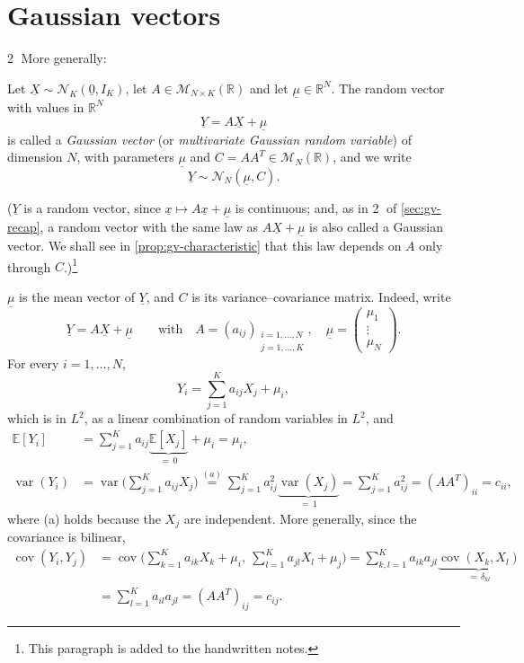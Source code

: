 \section{Gaussian vectors}\label{sec:gv-gaussian}

\textcircled{\scriptsize 2} More generally:

\begin{definition}\label{def:gv-gaussian-vector}
Let $\underline X\sim\mathcal N_K(\underline 0,I_K)$, let $A\in\mathcal M_{N\times K}(\mathbb R)$ and
let $\underline\mu\in\mathbb R^N$. The random vector with values in $\mathbb R^N$
\[
  \underline Y=A\underline X+\underline\mu
\]
is called a \emph{Gaussian vector} (or \emph{multivariate Gaussian random variable}) of dimension
$N$, with parameters $\underline\mu$ and $C=AA^T\in\mathcal M_N(\mathbb R)$, and we write
\[
  \underline Y\sim\mathcal N_N(\underline\mu,C).
\]
\end{definition}

($\underline Y$ is a random vector, since $\underline x\mapsto A\underline x+\underline\mu$ is
continuous; and, as in \textcircled{\scriptsize 2} of \cref{sec:gv-recap}, a random vector with
the same law as $A\underline X+\underline\mu$ is also called a Gaussian vector. We shall see in
\cref{prop:gv-characteristic} that this law depends on $A$ only through $C$.)\footnote{This
paragraph is added to the handwritten notes.}

\begin{remark}\label{rem:gv-mean-covariance}
$\underline\mu$ is the mean vector of $\underline Y$, and $C$ is its variance--covariance matrix.
Indeed, write
\[
  \underline Y=A\underline X+\underline\mu\qquad\text{with}\quad A=(a_{ij})_{\substack{i=1,\dots,N\\j=1,\dots,K}},\quad
  \underline\mu=\begin{pmatrix}\mu_1\\\vdots\\\mu_N\end{pmatrix}.
\]
For every $i=1,\dots,N$,
\[
  Y_i=\sum_{j=1}^Ka_{ij}X_j+\mu_i ,
\]
which is in $L^2$, as a linear combination of random variables in $L^2$, and
\[
\begin{aligned}
  \mathbb E[Y_i]&=\sum_{j=1}^Ka_{ij}\underbrace{\mathbb E[X_j]}_{=\,0}+\mu_i=\mu_i,\\
  \operatorname{var}(Y_i)&=\operatorname{var}\Big(\sum_{j=1}^Ka_{ij}X_j\Big)
  \overset{(a)}{=}\sum_{j=1}^Ka_{ij}^2\underbrace{\operatorname{var}(X_j)}_{=\,1}
  =\sum_{j=1}^Ka_{ij}^2=(AA^T)_{ii}=c_{ii},
\end{aligned}
\]
where (a) holds because the $X_j$ are independent. More generally, since the covariance is
bilinear,
\[
\begin{aligned}
  \operatorname{cov}(Y_i,Y_j)&=\operatorname{cov}\Big(\sum_{k=1}^Ka_{ik}X_k+\mu_i,\ \sum_{l=1}^Ka_{jl}X_l+\mu_j\Big)
  =\sum_{k,l=1}^Ka_{ik}a_{jl}\underbrace{\operatorname{cov}(X_k,X_l)}_{=\,\delta_{kl}}\\
  &=\sum_{l=1}^Ka_{il}a_{jl}=(AA^T)_{ij}=c_{ij}.
\end{aligned}
\]
\end{remark}

